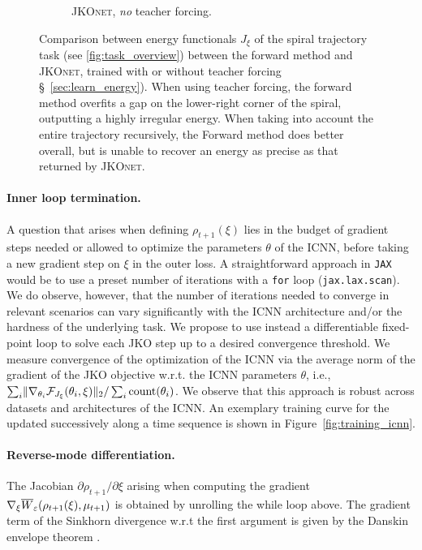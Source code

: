 \begin{figure}[t]
\begin{subfigure}[t]{0.24\textwidth}
         \caption{\textsc{JKOnet}, \protect\newline \emph{no} teacher forcing.}
     \end{subfigure}
	 \caption{Comparison between energy functionals $J_\xi$ of the spiral trajectory task (see \ref{fig:task_overview}) between the forward method and \textsc{JKOnet}, trained with or without teacher forcing \S~\ref{sec:learn_energy}). When using teacher forcing, the forward method overfits a gap on the lower-right corner of the spiral, outputting a highly irregular energy. When taking into account the entire trajectory recursively, the Forward method does better overall, but is unable to recover an energy as precise as that returned by \textsc{JKOnet}.}
	 \label{fig:exp_comp_spiral}
\end{figure}


\paragraph{Inner loop termination.} A question that arises when defining $\rho_{t+1}(\xi)$ lies in the budget of gradient steps needed or allowed to optimize the parameters $\theta$ of the ICNN, before taking a new gradient step on $\xi$ in the outer loss. A straightforward approach in \texttt{JAX} \citep{jax2018github} would be to use a preset number of iterations with a \texttt{for} loop (\texttt{jax.lax.scan}). 
We do observe, however, that the number of iterations needed to converge in relevant scenarios can vary significantly with the ICNN architecture and/or the hardness of the underlying task.
We propose to use instead a differentiable fixed-point loop to solve each \acrshort{JKO} step up to a desired convergence threshold.
We measure convergence of the optimization of the ICNN via the average norm of the gradient of the \acrshort{JKO} objective w.r.t. the ICNN parameters $\theta$, i.e., $\sum_i \lVert\nabla_{\theta_i}\mathcal{F}_{J_\xi}(\theta_i, \xi)\rVert_2/\sum_i \text{count}(\theta_i)$.
We observe that this approach is robust across datasets and architectures of the ICNN. An exemplary training curve for the  updated successively along a time sequence is shown in Figure~\ref{fig:training_icnn}.

\paragraph{Reverse-mode differentiation.} The Jacobian $\partial \rho_{t+1} / \partial\xi$ arising when computing the gradient $\nabla_\xi \overline{W}_{\varepsilon}(\rho_{t+1}(\xi), \mu_{t+1})$ is obtained by unrolling the while loop above. The gradient term of the Sinkhorn divergence w.r.t the first argument is given by the Danskin envelope theorem \citep{danskin2012theory}.

